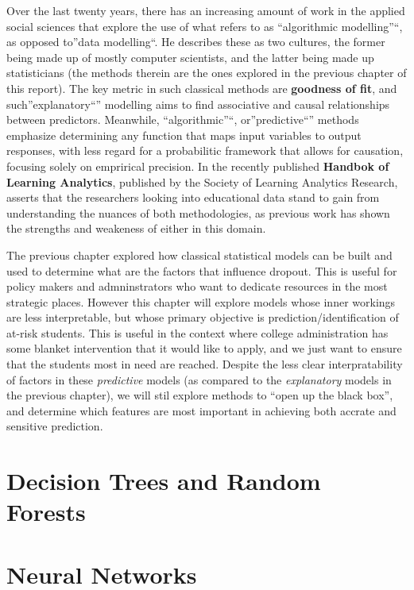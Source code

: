 \documentclass[]{book}
\theoremstyle{definition}
\theoremstyle{definition}
\theoremstyle{remark}
\begin{document}
Over the last twenty years, there has an increasing amount of work in
the applied social sciences that explore the use of what
\citep{breiman2001twocultures} refers to as ``algorithmic modelling''``,
as opposed to''data modelling``. He describes these as two cultures, the
former being made up of mostly computer scientists, and the latter being
made up statisticians (the methods therein are the ones explored in the
previous chapter of this report). The key metric in such classical
methods are \textbf{goodness of fit}, and such''explanatory``''
modelling aims to find associative and causal relationships between
predictors. Meanwhile, ``algorithmic''``, or''predictive``'' methods
emphasize determining any function that maps input variables to output
responses, with less regard for a probabilitic framework that allows for
causation, focusing solely on emprirical
precision\citep{shmueli2010explain}. In the recently published
\textbf{Handbok of Learning Analytics}\citep{hla2017}, published by the
Society of Learning Analytics Research, \citep{bergner_measurement_2017}
asserts that the researchers looking into educational data stand to gain
from understanding the nuances of both methodologies, as previous work
has shown the strengths and weakeness of either in this domain.

The previous chapter explored how classical statistical models can be
built and used to determine what are the factors that influence dropout.
This is useful for policy makers and admninstrators who want to dedicate
resources in the most strategic places. However this chapter will
explore models whose inner workings are less interpretable, but whose
primary objective is prediction/identification of at-risk students. This
is useful in the context where college administration has some blanket
intervention that it would like to apply, and we just want to ensure
that the students most in need are reached. Despite the less clear
interpratability of factors in these \emph{predictive} models (as
compared to the \emph{explanatory} models in the previous chapter), we
will stil explore methods to ``open up the black box'', and determine
which features are most important in achieving both accrate and
sensitive prediction.

\section{Decision Trees and Random
Forests}\label{decision-trees-and-random-forests}

\section{Neural Networks}\label{neural-networks}
\end{document}
